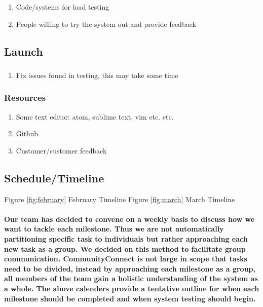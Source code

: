 \documentclass[12pt]{article}
\begin{document}
	  	\subsubsection{\bf }
				\begin{enumerate}
 					\item Code/systems for load testing
			 		\item	People willing to try the system out and provide feedback
				\end{enumerate}

		\subsection{\bf Launch}
			\subsubsection{\bf }
				\begin{enumerate}
					\item	Fix issues found in testing, this may take some time
				\end{enumerate}
	  	\subsubsection{\bf Resources}
				\begin{enumerate}
				  \item Some text editor: atom, sublime text, vim etc. etc.
			 		\item Github
 					\item Customer/customer feedback
				\end{enumerate}

	\subsection{\bf Schedule/Timeline}

		Figure \ref{fig:february} February Timeline
		Figure \ref{fig:march} March Timeline

		\paragraph{\normalfont \indent Our team has decided to convene on a weekly basis to discuss how we want to tackle each milestone. Thus we are not automatically partitioning specific task to individuals but rather approaching each new task as a group. We decided on this method to facilitate group communication. CommunityConnect is not large in scope that tasks need to be divided, instead by approaching each milestone as a group, all members of the team gain a holistic understanding of the system as a whole. The above calenders provide a tentative outline for when each milestone should be completed and when system testing should begin.
    }
\end{document}
